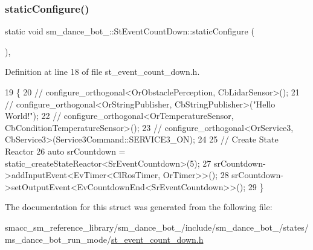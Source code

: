 \subsubsection{\texorpdfstring{static\+Configure()}{staticConfigure()}}
{\footnotesize\ttfamily static void sm\+\_\+dance\+\_\+bot\+\_\+::\+St\+Event\+Count\+Down\+::static\+Configure (\begin{DoxyParamCaption}{ }\end{DoxyParamCaption})\hspace{0.3cm}{\ttfamily [inline]}, {\ttfamily [static]}}



Definition at line 18 of file st\+\_\+event\+\_\+count\+\_\+down.\+h.


\begin{DoxyCode}
19     \{
20         \textcolor{comment}{//   configure\_orthogonal<OrObstaclePerception, CbLidarSensor>();}
21         \textcolor{comment}{//   configure\_orthogonal<OrStringPublisher, CbStringPublisher>("Hello World!");}
22         \textcolor{comment}{//   configure\_orthogonal<OrTemperatureSensor, CbConditionTemperatureSensor>();}
23         \textcolor{comment}{//   configure\_orthogonal<OrService3, CbService3>(Service3Command::SERVICE3\_ON);      }
24         
25         \textcolor{comment}{// Create State Reactor}
26         \textcolor{keyword}{auto} srCountdown = static\_createStateReactor<SrEventCountdown>(5);        
27         srCountdown->addInputEvent<EvTimer<ClRosTimer, OrTimer>>();
28         srCountdown->setOutputEvent<EvCountdownEnd<SrEventCountdown>>();
29     \}
\end{DoxyCode}


The documentation for this struct was generated from the following file\+:\begin{DoxyCompactItemize}
\item 
smacc\+\_\+sm\+\_\+reference\+\_\+library/sm\+\_\+dance\+\_\+bot\+\_/include/sm\+\_\+dance\+\_\+bot\+\_/states/ms\+\_\+dance\+\_\+bot\+\_\+run\+\_\+mode/\hyperlink{sm__dance__bot__2_2include_2sm__dance__bot__2_2states_2ms__dance__bot__run__mode_2st__event__count__down_8h}{st\+\_\+event\+\_\+count\+\_\+down.\+h}\end{DoxyCompactItemize}
